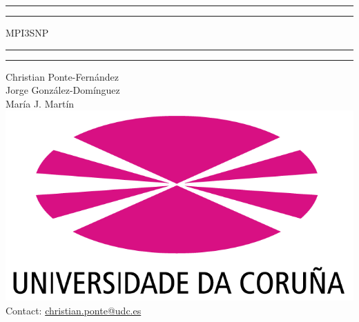 \documentclass[12pt,hidelinks]{article}
\begin{document}
\begin{titlepage}
    \centering %
    \scshape %
    \vspace*{1.5\baselineskip} %

    \rule{13cm}{1.6pt}\vspace*{-\baselineskip}\vspace*{2pt} %
    \rule{13cm}{0.4pt} %
    
        \vspace{0.75\baselineskip} %
    {    \Huge MPI3SNP \\    }
        \vspace{0.75\baselineskip} %
    \rule{13cm}{0.4pt}\vspace*{-\baselineskip}\vspace{3.2pt} %
    \rule{13cm}{1.6pt} %
    
        \vspace{1.75\baselineskip} %
    {\large 
        Christian Ponte-Fernández \\ \vspace{1mm}
        Jorge González-Domínguez \\ \vspace{2.5mm}
        María J. Martín
    } \\
    \vfill
    \includegraphics[width=.35\textwidth]{logo} \\
    \vspace{1mm}
    Contact: \url{christian.ponte@udc.es}\\ 
\end{titlepage}
\clearpage
\thispagestyle{empty}
\mbox{}
\clearpage
\setcounter{page}{1}
\tableofcontents
\newpage
{}
\end{document}
